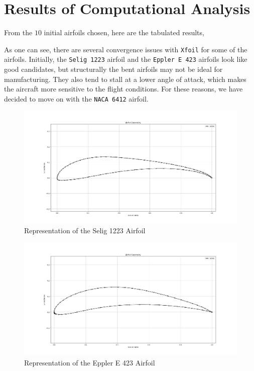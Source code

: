 \section{Results of Computational Analysis}

From the $10$ initial airfoils chosen, here are the tabulated results,

$$$$
As one can see, there are several convergence issues with \texttt{Xfoil} for some of the airfoils. Initially, the \texttt{Selig 1223}  airfoil and the \texttt{Eppler E 423} airfoils look like good candidates, but structurally the bent airfoils may not be ideal for manufacturing. They also tend to stall at a lower angle of attack, which makes the aircraft more sensitive to the flight conditions. For these reasons, we have decided to move on with the \texttt{NACA 6412} airfoil.
\begin{figure}[H]\centering
\includegraphics[scale=\size]{Content/Images/Selig_1223_Sketch.png}
\caption{Representation of the Selig 1223 Airfoil}
\label{Selig_Sketch}
\end{figure}
\begin{figure}[H]\centering
\includegraphics[scale=\size]{Content/Images/Eppler_E_423.png}
\caption{Representation of the Eppler E 423 Airfoil}
\label{Eppler_Sketch}
\end{figure}
